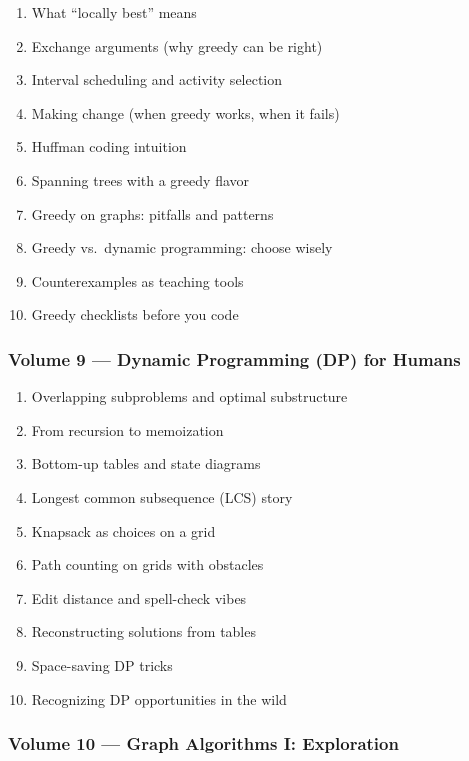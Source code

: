 \documentclass[
  letterpaper,
  DIV=11,
  numbers=noendperiod]{scrreprt}
\providecommand{\tightlist}{%
  \setlength{\itemsep}{0pt}\setlength{\parskip}{0pt}}
\begin{document}
\begin{enumerate}
\def\labelenumi{\arabic{enumi}.}
\setcounter{enumi}{70}
\tightlist
\item
  What ``locally best'' means
\item
  Exchange arguments (why greedy can be right)
\item
  Interval scheduling and activity selection
\item
  Making change (when greedy works, when it fails)
\item
  Huffman coding intuition
\item
  Spanning trees with a greedy flavor
\item
  Greedy on graphs: pitfalls and patterns
\item
  Greedy vs.~dynamic programming: choose wisely
\item
  Counterexamples as teaching tools
\item
  Greedy checklists before you code
\end{enumerate}

\subsubsection{Volume 9 --- Dynamic Programming (DP) for
Humans}\label{volume-9-dynamic-programming-dp-for-humans}

\begin{enumerate}
\def\labelenumi{\arabic{enumi}.}
\setcounter{enumi}{80}
\tightlist
\item
  Overlapping subproblems and optimal substructure
\item
  From recursion to memoization
\item
  Bottom-up tables and state diagrams
\item
  Longest common subsequence (LCS) story
\item
  Knapsack as choices on a grid
\item
  Path counting on grids with obstacles
\item
  Edit distance and spell-check vibes
\item
  Reconstructing solutions from tables
\item
  Space-saving DP tricks
\item
  Recognizing DP opportunities in the wild
\end{enumerate}

\subsubsection{Volume 10 --- Graph Algorithms I:
Exploration}\label{volume-10-graph-algorithms-i-exploration}
\end{document}
